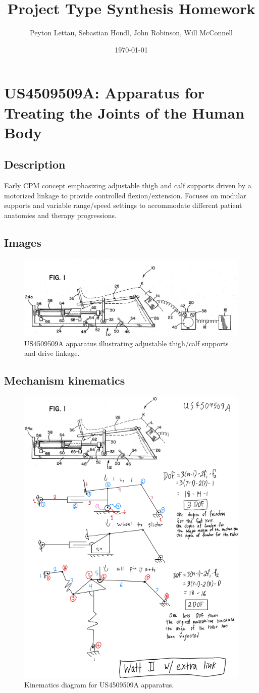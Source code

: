 \documentclass[11pt]{article}
\title{Project Type Synthesis Homework}
\author{Peyton Lettau, Sebastian Hondl, John Robinson, Will McConnell}
\date{\today}
\begin{document}
\maketitle

\tableofcontents
\newpage

\section{US4509509A: Apparatus for Treating the Joints of the Human Body}
\subsection{Description}
Early CPM concept emphasizing adjustable thigh and calf supports driven by a motorized linkage to provide controlled flexion/extension. Focuses on modular supports and variable range/speed settings to accommodate different patient anatomies and therapy progressions.
\subsection{Images}
\begin{figure}[H]
  \centering
  \includegraphics[width=0.54\linewidth]{US4509509.png}
  \caption{US4509509A apparatus illustrating adjustable thigh/calf supports and drive linkage.}
  \label{fig:US4509509A}
\end{figure}

\subsection{Mechanism kinematics}
\begin{figure}[H]
  \centering
  \includegraphics[width=0.54\linewidth]{../Kinematic Mechanism Images/4509509.png}
  \caption{Kinematics diagram for US4509509A apparatus.}
  \label{fig:US4509509A_kinematics}
\end{figure}
\end{document}
